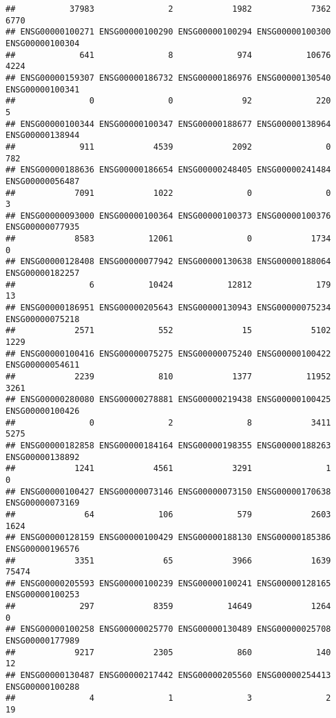 \documentclass[
]{article}
\begin{document}
\begin{verbatim}
##           37983               2            1982            7362            6770 
## ENSG00000100271 ENSG00000100290 ENSG00000100294 ENSG00000100300 ENSG00000100304 
##             641               8             974           10676            4224 
## ENSG00000159307 ENSG00000186732 ENSG00000186976 ENSG00000130540 ENSG00000100341 
##               0               0              92             220               5 
## ENSG00000100344 ENSG00000100347 ENSG00000188677 ENSG00000138964 ENSG00000138944 
##             911            4539            2092               0             782 
## ENSG00000188636 ENSG00000186654 ENSG00000248405 ENSG00000241484 ENSG00000056487 
##            7091            1022               0               0               3 
## ENSG00000093000 ENSG00000100364 ENSG00000100373 ENSG00000100376 ENSG00000077935 
##            8583           12061               0            1734               0 
## ENSG00000128408 ENSG00000077942 ENSG00000130638 ENSG00000188064 ENSG00000182257 
##               6           10424           12812             179              13 
## ENSG00000186951 ENSG00000205643 ENSG00000130943 ENSG00000075234 ENSG00000075218 
##            2571             552              15            5102            1229 
## ENSG00000100416 ENSG00000075275 ENSG00000075240 ENSG00000100422 ENSG00000054611 
##            2239             810            1377           11952            3261 
## ENSG00000280080 ENSG00000278881 ENSG00000219438 ENSG00000100425 ENSG00000100426 
##               0               2               8            3411            5275 
## ENSG00000182858 ENSG00000184164 ENSG00000198355 ENSG00000188263 ENSG00000138892 
##            1241            4561            3291               1               0 
## ENSG00000100427 ENSG00000073146 ENSG00000073150 ENSG00000170638 ENSG00000073169 
##              64             106             579            2603            1624 
## ENSG00000128159 ENSG00000100429 ENSG00000188130 ENSG00000185386 ENSG00000196576 
##            3351              65            3966            1639           75474 
## ENSG00000205593 ENSG00000100239 ENSG00000100241 ENSG00000128165 ENSG00000100253 
##             297            8359           14649            1264               0 
## ENSG00000100258 ENSG00000025770 ENSG00000130489 ENSG00000025708 ENSG00000177989 
##            9217            2305             860             140              12 
## ENSG00000130487 ENSG00000217442 ENSG00000205560 ENSG00000254413 ENSG00000100288 
##               4               1               3               2              19 

\end{verbatim}
\end{document}
